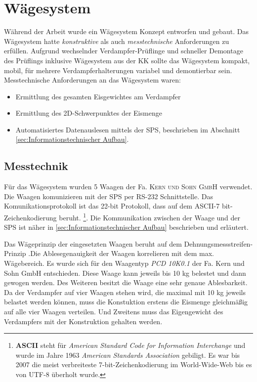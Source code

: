 
\section{Wägesystem}
\label{sec:Waegesystem}

Während der Arbeit wurde ein Wägesystem Konzept entworfen und gebaut. Das Wägesystem hatte \textit{konstruktive} als auch \textit{messtechnische} Anforderungen zu erfüllen. Aufgrund wechselnder Verdampfer-Prüflinge und schneller Demontage des Prüflings inklusive Wägesystem aus der KK sollte das Wägesystem  kompakt, mobil, für mehrere Verdampferhalterungen variabel und demontierbar sein. 
Messtechnische Anforderungen an das Wägesystem waren:

\begin{itemize}
\item Ermittlung des gesamten Eisgewichtes am Verdampfer
\item Ermittlung des 2D-Schwerpunktes der Eismenge
\item Automatisiertes Datenauslesen mittels der SPS, beschrieben im Abschnitt \ref{sec:Informationstechnischer Aufbau}.
\end{itemize}

\subsection{Messtechnik}
\label{subsec:Waagen-Messtechnik}

Für das Wägesystem wurden 5 Waagen der Fa. \textsc{Kern und Sohn GmbH} verwendet. Die Waagen komunizieren mit der SPS per RS-232 Schnittstelle. Das Komunikationsprotokoll ist das 22-bit Protokoll, dass auf dem \textsc{ASCII}-7 bit- Zeichenkodierung beruht. \footnote{\textbf{ASCII} steht für \textit{American Standard Code for Information Interchange} und wurde im Jahre 1963  \textit{American Standards Association} gebiligt. Es war bis 2007 die meist verbreiteste 7-bit-Zeichenkodierung im World-Wide-Web bis es von UTF-8 überholt wurde.}. Die Kommunikation zwischen der Waage und der SPS ist näher in \ref{sec:Informationstechnischer Aufbau} beschrieben und erläutert.

Das Wägeprinzip der eingesetzten Waagen beruht auf dem Dehnungsmessstreifen-Prinzip .Die Ablesegenauigkeit der Waagen korrelieren mit dem max. Wägebereich. Es wurde sich für den Waagentyp \textit{PCD 10K0.1} der Fa. Kern und Sohn GmbH entschieden. Diese Waage kann  jeweils  bis 10 kg belestet und dann gewogen werden. Des Weiteren besitzt die Waage eine sehr genaue Ablesbarkeit. Da der Verdampfer auf vier Waagen stehen wird, die maximal mit 10 kg jeweils belastet werden können, muss die Konstuktion erstens die Eismenge gleichmäßig auf alle vier Waagen verteilen. Und Zweitens muss das Eigengewicht des Verdampfers mit der Konstruktion gehalten werden. 


